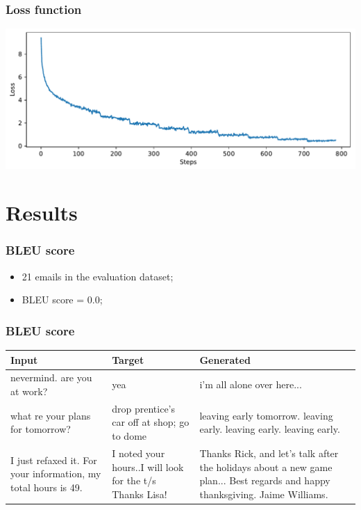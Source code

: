 \documentclass{beamer}
\begin{document}
\begin{frame}
  \frametitle{Loss function}

  \includegraphics[width=\textwidth]{../images/loss_function.pdf}
\end{frame}


\section{Results}

\begin{frame}
  \frametitle{BLEU score}

  \begin{itemize}
    \item <1-> 21 emails in the evaluation dataset;
    \item <2-> BLEU score = \num{0.0};
  \end{itemize}
\end{frame}

\begin{frame}
  \frametitle{BLEU score}

  \begin{table}
    \begin{tabularx}{\textwidth}{|X|X|X|}
      \hline
      \textbf{Input}                                                  & \textbf{Target}                                          & \textbf{Generated}                                                                                                           \\
      \hline
      nevermind.  are you at work?                                    & yea                                                      & i'm all alone over here...                                                                                                   \\
      \hline
      what re your plans for tomorrow?                                & drop prentice's car off at shop; go to dome              & leaving early tomorrow. leaving early. leaving early. leaving early.                                                         \\
      \hline
      I just refaxed it.  For your information, my total hours is 49. & I noted your hours..I will look for the t/s Thanks Lisa! & Thanks Rick, and let's talk after the holidays about a new game plan... Best regards and happy thanksgiving. Jaime Williams. \\
      \hline
    \end{tabularx}
  \end{table}
\end{frame}
\end{document}
